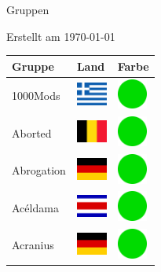 \documentclass[12pt, a4paper, twoside]{report}
\begin{document}
	
	\begin{center}
		\vspace{1cm}
		{\Large Gruppen\par}
		
		{\large Erstellt am \today\par}
	\end{center}
	
	\begin{center}
		\begin{longtable}{|p{5cm}|p{2cm}|p{2cm}|} 
			
			\hline
			\rowcolor{lightgray} Gruppe & Land & Farbe \\ \hline
			\endhead
1000Mods & \includegraphics[width=1cm]{4x3/gr} & \includegraphics[width=1cm]{likes/y} \\ \hline
Aborted & \includegraphics[width=1cm]{4x3/be} & \includegraphics[width=1cm]{likes/y} \\ \hline
Abrogation & \includegraphics[width=1cm]{4x3/de} & \includegraphics[width=1cm]{likes/y} \\ \hline
Acéldama & \includegraphics[width=1cm]{4x3/cr} & \includegraphics[width=1cm]{likes/y} \\ \hline
Acranius & \includegraphics[width=1cm]{4x3/de} & \includegraphics[width=1cm]{likes/y} \\ \hline

\end{longtable}
\end{center}
\end{document}
